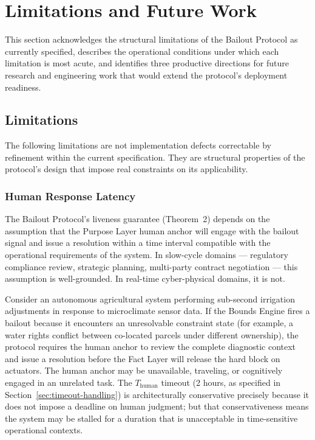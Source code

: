 \section{Limitations and Future Work}\label{sec:limitations}

This section acknowledges the structural limitations of the Bailout Protocol as currently specified, describes the operational conditions under which each limitation is most acute, and identifies three productive directions for future research and engineering work that would extend the protocol's deployment readiness.

\subsection{Limitations}\label{sec:limitations:subsection}

The following limitations are not implementation defects correctable by refinement within the current specification. They are structural properties of the protocol's design that impose real constraints on its applicability.

\subsubsection{Human Response Latency}\label{sec:human-response-latency}

The Bailout Protocol's liveness guarantee (Theorem~2) depends on the assumption that the Purpose Layer human anchor will engage with the bailout signal and issue a resolution within a time interval compatible with the operational requirements of the system. In slow-cycle domains --- regulatory compliance review, strategic planning, multi-party contract negotiation --- this assumption is well-grounded. In real-time cyber-physical domains, it is not.

Consider an autonomous agricultural system performing sub-second irrigation adjustments in response to microclimate sensor data. If the Bounds Engine fires a bailout because it encounters an unresolvable constraint state (for example, a water rights conflict between co-located parcels under different ownership), the protocol requires the human anchor to review the complete diagnostic context and issue a resolution before the Fact Layer will release the hard block on actuators. The human anchor may be unavailable, traveling, or cognitively engaged in an unrelated task. The $T_{\text{human}}$ timeout (2 hours, as specified in Section~\ref{sec:timeout-handling}) is architecturally conservative precisely because it does not impose a deadline on human judgment; but that conservativeness means the system may be stalled for a duration that is unacceptable in time-sensitive operational contexts.

